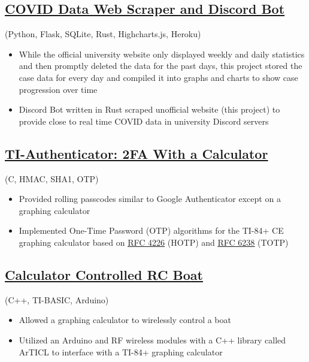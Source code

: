 \documentclass{article}
\begin{document}
\subsection{\href{https://github.com/jshin313/unofficial-temple-covid-live-dashboard}{\underline{COVID Data Web Scraper and Discord Bot}}} (Python, Flask, SQLite, Rust, Highcharts.js, Heroku)
\begin{itemize}
    \item While the official university website only displayed weekly and daily statistics and then promptly deleted the data for the past days, this project stored the case data for every day and compiled it into graphs and charts to show case progression over time
    \item Discord Bot written in Rust scraped unofficial website (this project) to provide close to real time COVID data in university Discord servers
\end{itemize}

\subsection{\href{https://github.com/jshin313/ti-authenticator}{\underline{TI-Authenticator: 2FA With a Calculator}}} (C, HMAC, SHA1, OTP)
\begin{itemize}
    \item Provided rolling passcodes similar to Google Authenticator except on a graphing calculator
    \item Implemented One-Time Password (OTP) algorithms for the TI-84+ CE graphing calculator based on \href{https://tools.ietf.org/html/rfc4226}{\underline{RFC 4226}} (HOTP) and \href{https://tools.ietf.org/html/rfc6238}{\underline{RFC 6238}} (TOTP)
\end{itemize}

\subsection{\href{https://github.com/jshin313/CalcControlledBoat}{\underline{Calculator Controlled RC Boat}}} (C++, TI-BASIC, Arduino)
\begin{itemize}
    \item Allowed a graphing calculator to wirelessly control a boat
    \item Utilized an Arduino and RF wireless modules with a C++ library called ArTICL to interface with a TI-84+ graphing calculator
\end{itemize}
\end{document}

